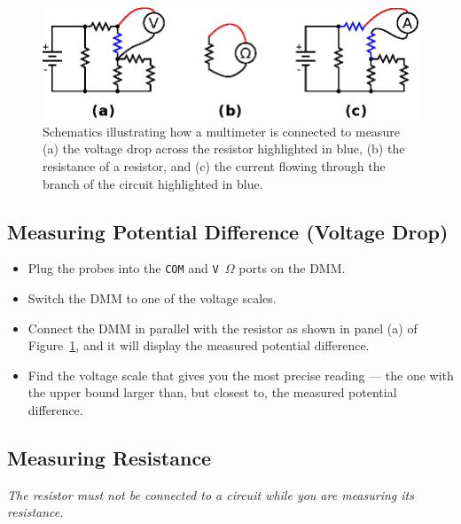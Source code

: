 \documentclass[11pt]{article}
\begin{document}
\begin{figure}[ht]
  \begin{center}
    \includegraphics{dmm.eps}
    
    \caption{Schematics illustrating how a multimeter is connected to
      measure (a) the voltage drop across the resistor highlighted in
      blue, (b) the resistance of a resistor, and (c) the current
      flowing through the branch of the circuit highlighted in blue.}
    \label{fig:dmm}
  \end{center}
\end{figure}

\subsection{Measuring Potential Difference (Voltage Drop)}

\begin{itemize}
\item Plug the probes into the \texttt{COM} and \texttt{V\,$\Omega$}
  ports on the DMM.

\item Switch the DMM to one of the voltage scales.
  
\item Connect the DMM in parallel with the resistor as shown in panel
  (a) of Figure~\ref{fig:dmm}, and it will display the measured
  potential difference.

\item Find the voltage scale that gives you the most
  precise reading --- the one with the upper bound larger than, but
  closest to, the measured potential difference.
\end{itemize}

\subsection{Measuring Resistance}

\emph{The resistor must not be connected to a circuit while you are
  measuring its resistance.}
\end{document}
